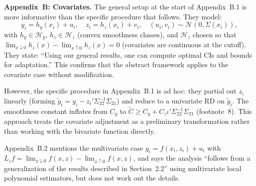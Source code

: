 \begin{itemize}
	\textbf{Appendix~B: Covariates.}
	The general setup at the start of Appendix~B.1 is more informative than the specific procedure that follows.
	They model:
	\begin{equation*}
		y_i = h_y(x_i) + u_i, \quad z_i = h_z(x_i) + v_i, \quad (u_i, v_i) \sim \mathcal{N}(0, \Sigma(x_i)),
	\end{equation*}
	with $h_y \in \mathcal{H}_y$, $h_z \in \mathcal{H}_z$ (convex smoothness classes), and $\mathcal{H}_z$ chosen so that $\lim_{x \downarrow 0} h_z(x) - \lim_{x \uparrow 0} h_z(x) = 0$ (covariates are continuous at the cutoff).
	They state: ``Using our general results, one can compute optimal CIs and bounds for adaptation.''
	This confirms that the abstract framework applies to the covariate case without modification.

	However, the specific procedure in Appendix~B.1 is ad hoc: they partial out $z_i$ linearly (forming $\tilde{y}_i = y_i - z_i' \Sigma_{22}^{-1}\Sigma_{21}$) and reduce to a univariate RD on $\tilde{y}_i$.
	The smoothness constant inflates from $C_y$ to $\tilde{C} \geq C_y + C_z \iota' \Sigma_{22}^{-1}\Sigma_{21}$ (footnote~8).
	This approach treats the covariate adjustment as a preliminary transformation rather than working with the bivariate function directly.

	Appendix~B.2 mentions the multivariate case $y_i = f(x_i, z_i) + u_i$ with $L_z f = \lim_{x \downarrow 0} f(x,z) - \lim_{x \uparrow 0} f(x,z)$, and says the analysis ``follows from a generalization of the results described in Section~2.2'' using multivariate local polynomial estimators, but does not work out the details.



\end{itemize}

